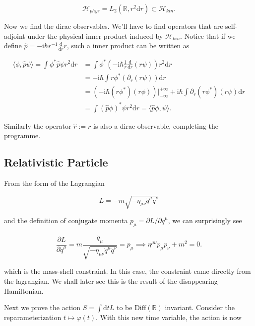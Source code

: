 \documentclass{article}
\begin{document}
$$
\mathcal{H}_{phys} = L_2(\mathbb{R},r^2\mathrm{d}r) \subset \mathcal{H}_{kin}.
$$

Now we find the dirac observables. We'll have to find operators that are self-adjoint under the physical inner product induced by $\mathcal{H}_{kin}$. Notice that if we define $\hat{p} = -\mathrm{i}\hbar r^{-1}\frac{\mathrm{d}}{\mathrm{d}r}r$, such a inner product can be written as

$$
\begin{aligned}
    \langle\phi, \hat{p}\psi\rangle = \int \phi^\ast\hat{p}\psi r^2\mathrm{d}r
    &=  \int \phi^\ast\left(-\mathrm{i}\hbar \frac{1}{r}\frac{\mathrm{d}}{\mathrm{d}r}\left(r\psi\right) \right)r^2\mathrm{d}r\\
    &=  -\mathrm{i}\hbar \int r\phi^\ast\left(\partial_r\left(r\psi\right) \right)\mathrm{d}r\\
    &=  \left(-\mathrm{i}\hbar(r\phi^\ast)(r\phi)\right)\Big|^{+\infty}_{-\infty} + \mathrm{i}\hbar \int \partial_r(r\phi^\ast)\left(r\psi\right)\mathrm{d}r\\
    &=  \int\left(\hat{p}\phi\right)^\ast\psi r^2\mathrm{d}r = \langle\hat{p}\phi, \psi\rangle.
\end{aligned}
$$

Similarly the operator $\hat{r} := r$ is also a dirac observable, completing the programme.

\hrulefill

\subsection{Relativistic Particle}

From the form of the Lagrangian

$$
L = -m\sqrt{-\eta_{\mu\nu} \dot{q}^\mu\dot{q}^\nu}
$$

and the definition of conjugate momenta $p_\mu = \partial L/\partial \dot{q}^\mu$, we can surprisingly see

$$
\frac{\partial L}{\partial \dot{q}^\mu} = m\frac{\dot{q}_\mu}{\sqrt{-\eta_{\mu\nu} \dot{q}^\mu\dot{q}^\nu}} = p_\mu \implies \eta^{\mu\nu}p_\mu p_\nu + m^2 = 0.
$$

which is the mass-shell constraint. In this case, the constraint came directly from the lagrangian. We shall later see this is the result of the disappearing Hamiltonian.

Next we prove the action $S = \int \mathrm{d}t L$ to be $\mathrm{Diff}(\mathbb{R})$ invariant. Consider the reparameterization $t\mapsto \varphi(t)$. With this new time variable, the action is now
\end{document}
